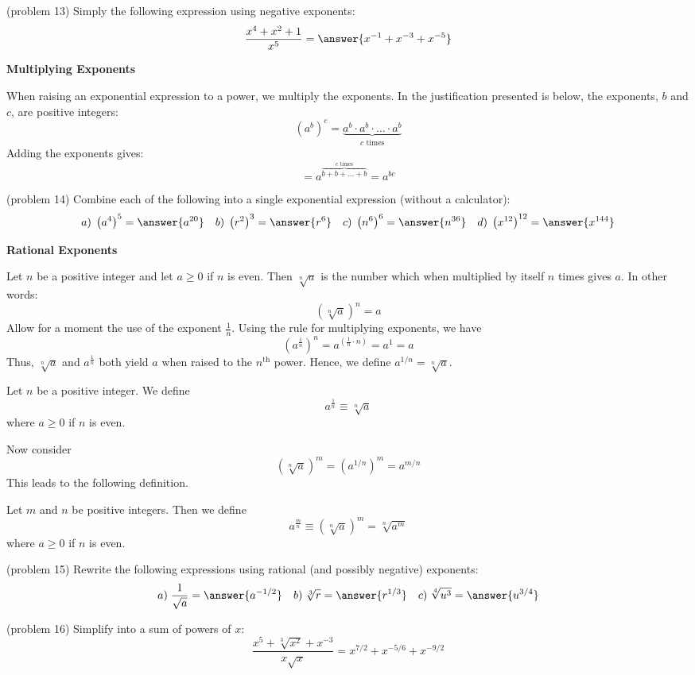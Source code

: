 \documentclass[handout]{ximera}
\begin{document}
\begin{problem}(problem 13)
Simply the following expression using negative exponents:
\[
\frac{x^4 + x^2 + 1}{x^5} = \answer{x^{-1} + x^{-3} + x^{-5}}
\]
\end{problem}


\begin{center}
\textbf{Multiplying Exponents}
\end{center}

When raising an exponential expression to a power, we multiply the exponents. 
In the justification presented is below, the exponents, $b$ and $c$, are positive integers:
\[
\left(a^b\right)^c = \underbrace{a^b \cdot a^b  \cdot \ldots \cdot a^b}_\text{$c$ times}
\]
Adding the exponents gives:
\[
= a^{\overbrace{b + b + \dots +b}^\text{$c$ times}} = a^{bc}
\]

\begin{problem}(problem 14)
Combine each of the following into a single exponential expression (without a calculator):
\[
a) \;\left(a^4\right)^5 = \answer{a^{20}} \quad b) \;\left(r^2\right)^3  = \answer{r^6} \quad c) \;\left(n^6\right)^6 = \answer{n^{36}} 
\quad d) \;\left(x^{12}\right)^{12} = \answer{x^{144}}
\]
\end{problem}

\begin{center}
\textbf{Rational Exponents}
\end{center}
Let $n$ be a positive integer and let $a\geq 0$ if $n$ is even. 
Then  $\sqrt[n] a$ is the number which when multiplied by itself $n$ times gives $a$.
In other words:
\[
(\sqrt[n] a)^n = a
\]
Allow for a moment the use of the exponent $\frac{1}{n}$.  Using the rule for multiplying exponents, we have
\[
\left(a^\frac{1}{n}\right)^n = a^{\left(\frac{1}{n} \cdot n\right)} = a^1 = a
\]
Thus, $\sqrt[n] a$ and $a^\frac{1}{n}$ both yield $a$ when raised to the $n^\text{th}$ power.
Hence, we define $a^{1/n} = \sqrt[n] a$.
\begin{definition}
Let $n$ be a positive integer. We define
\[
a^{\frac{1}{n}} \equiv \sqrt[n] a
\]
where $a \geq 0 $ if $n$ is even.
\end{definition}

Now consider
\[
(\sqrt[n] a)^m = \left(a^{1/n}\right)^m = a^{m/n}
\]
This leads to the following definition.
\begin{definition}
Let $m$ and $n$ be positive integers. Then we define
\[
a^{\frac{m}{n}} \equiv (\sqrt[n] a)^m = \sqrt[n]{a^m}
\]
where $a \geq 0 $ if $n$ is even.
\end{definition}


\begin{problem}(problem 15)
Rewrite the following expressions using rational (and possibly negative) exponents:
\[
a) \;\frac{1}{\sqrt a} = \answer{a^{-1/2}} \quad b) \;\sqrt[3] r = \answer{r^{1/3}} \quad c) \;\sqrt[4]{u^3} = \answer{u^{3/4}}
\]
\end{problem}


\begin{problem}(problem 16)
Simplify into a sum of powers of $x$: 
\[
\frac{x^5 + \sqrt[3]{x^2} + x^{-3}}{x\sqrt x} = x^{7/2} + x^{-5/6} + x^{-9/2}
\]
\end{problem}
\end{document}
